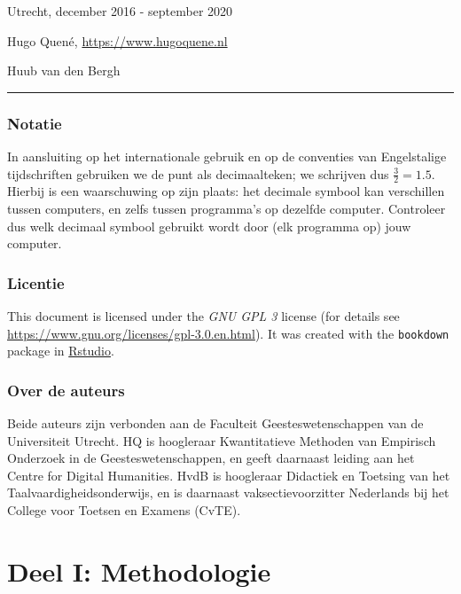 \documentclass[
]{book}
\begin{document}
Utrecht, december 2016 - september 2020

Hugo Quené, \url{https://www.hugoquene.nl}

Huub van den Bergh

\begin{center}\rule{0.5\linewidth}{0.5pt}\end{center}

\hypertarget{notatie}{%
\section*{Notatie}\label{notatie}}

In aansluiting op het internationale gebruik en op de conventies van Engelstalige tijdschriften gebruiken we de punt als decimaalteken; we schrijven dus \(\frac{3}{2}=1.5\). Hierbij is een waarschuwing op zijn plaats: het decimale symbool kan verschillen tussen computers, en zelfs tussen programma's op dezelfde computer. Controleer dus welk decimaal symbool gebruikt wordt door (elk programma op) jouw computer.

\hypertarget{licentie}{%
\section*{Licentie}\label{licentie}}

This document is licensed under the \emph{GNU GPL 3} license (for details see
\url{https://www.gnu.org/licenses/gpl-3.0.en.html}). It was created with the \texttt{bookdown} package \citep{R-bookdown} in \href{https://www.rstudio.com}{Rstudio}.

\hypertarget{over-de-auteurs}{%
\section*{Over de auteurs}\label{over-de-auteurs}}

Beide auteurs zijn verbonden aan de Faculteit Geesteswetenschappen van de Universiteit Utrecht. HQ is hoogleraar Kwantitatieve Methoden van Empirisch Onderzoek in de Geesteswetenschappen, en geeft daarnaast leiding aan het Centre for Digital Humanities. HvdB is hoogleraar Didactiek en Toetsing van het Taalvaardigheidsonderwijs, en is daarnaast vaksectievoorzitter Nederlands bij het College voor Toetsen en Examens (CvTE).

\hypertarget{part-deel-i-methodologie}{%
\part*{Deel I: Methodologie}\label{part-deel-i-methodologie}}
\end{document}
